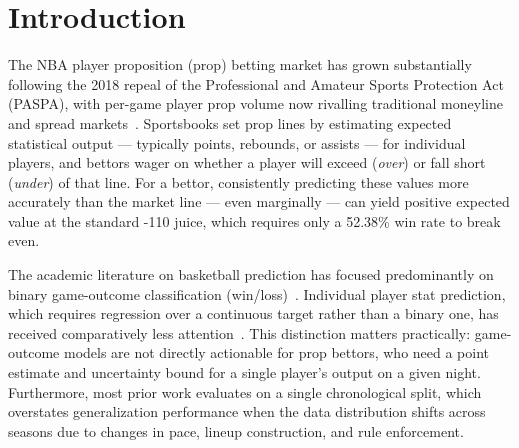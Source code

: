 \documentclass[12pt, letterpaper]{article}
\begin{document}
\newpage
\tableofcontents
\newpage

\section{Introduction}
\label{sec:intro}

The NBA player proposition (prop) betting market has grown substantially
following the 2018 repeal of the Professional and Amateur Sports Protection
Act (PASPA), with per-game player prop volume now rivalling traditional
moneyline and spread markets~\citep{galekwa2024systematic}.
Sportsbooks set prop lines by estimating expected statistical output ---
typically points, rebounds, or assists --- for individual players, and bettors
wager on whether a player will exceed (\textit{over}) or fall short
(\textit{under}) of that line.
For a bettor, consistently predicting these values more accurately than the
market line --- even marginally --- can yield positive expected value at the
standard -110 juice, which requires only a 52.38\% win rate to break even.

The academic literature on basketball prediction has focused predominantly on
binary game-outcome classification (win/loss)~\citep{chen2021hybrid,ouyang2024xgboost,nature2025stacked}.
Individual player stat prediction, which requires regression over a continuous
target rather than a binary one, has received comparatively less
attention~\citep{galekwa2024systematic, plosone2025systematic}.
This distinction matters practically: game-outcome models are not directly
actionable for prop bettors, who need a point estimate and uncertainty
bound for a single player's output on a given night.
Furthermore, most prior work evaluates on a single chronological split,
which overstates generalization performance when the data distribution
shifts across seasons due to changes in pace, lineup construction,
and rule enforcement.
\end{document}
